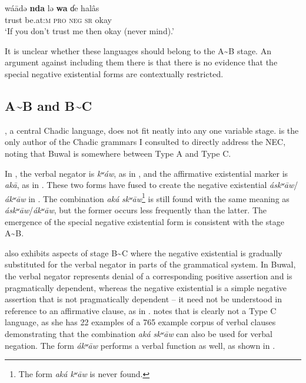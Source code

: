 \documentclass[output=paper,draft,draftmode,colorlinks,citecolor=brown]{langscibook}
\begin{document}
\gll wá\=adə \textbf{nda} lə \textbf{wa} ɗe halâs\\
trust be.at:\textsc{m} \textsc{pro} \textsc{neg} \textsc{sr} okay\\

\glt `If you don't trust me then okay (never mind).'

\z
\z

It is unclear whether these languages should belong to the A{\textasciitilde}B stage. An argument against including them there is that there is no evidence that the special negative existential forms are contextually restricted. 

\subsection{A{\textasciitilde}B and B{\textasciitilde}C}\label{sec:3:4.2}

, a central Chadic language, does not fit neatly into any one
variable stage. \citet[293]{Viljoen2013} is the only author of the
Chadic grammars I consulted to directly address the NEC, noting that Buwal is somewhere between Type A and Type C.  

In , the verbal negator is \textit{kʷáw}, as in , and the affirmative existential marker is \textit{ak\=a}, as in . These two forms have fused to create the negative existential \textit{áskʷ\=aw}/\textit{ákʷ\=aw} in . The combination \textit{aká} \textit{skʷ\=aw}\footnote{The form \textit{aká kʷ\=aw} is never found.} is still found with the same meaning as \textit{áskʷ\=aw}/\textit{ákʷ\=aw}, but the former occurs less frequently than the latter. The emergence of the special negative existential form is consistent with the stage A{\textasciitilde}B.
  
 also exhibits aspects of stage B{\textasciitilde}C where the negative existential is gradually substituted for the verbal negator in parts of the grammatical system. In Buwal, the verbal negator represents denial of a corresponding positive assertion and is pragmatically dependent, whereas the negative existential is a simple negative assertion that is not pragmatically dependent -- it need not be understood in reference to an affirmative clause, as in . 
\citet[293]{Viljoen2013} notes that  is clearly not a Type C
language, as she has 22 examples of a 765 example corpus of verbal clauses
demonstrating that the combination \textit{aká skʷ\=aw} can also be
used for verbal negation. The form \textit{ákʷāw} performs a verbal function as well, as shown in .   
\end{document}
